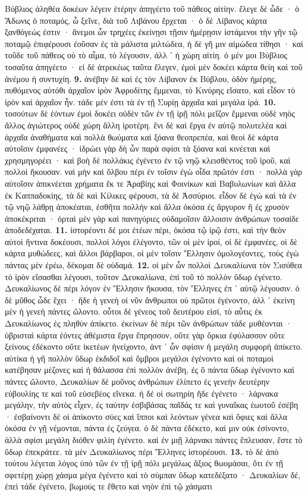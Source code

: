 \documentclass[a4paper, 11pt, oneside, polutonikogreek, german]{article}
\begin{document}
Βύβλιος ἀληθέα δοκέων λέγειν ἑτέρην ἀπηγέετο τοῦ πάθεος αἰτίην. ἔλεγε δὲ ὧδε · ὁ Ἄδωνις ὁ ποταμός, ὦ ξεῖνε, διὰ τοῦ Λιβάνου ἔρχεται · ὁ δὲ Λίβανος κάρτα ξανθόγεώς ἐστιν · ἄνεμοι ὦν τρηχέες ἐκείνῃσι τῇσιν ἡμέρῃσιν ἱστάμενοι τὴν γῆν τῷ ποταμῷ ἐπιφέρουσι ἐοῦσαν ἐς τὰ μάλιστα μιλτώδεα, ἡ δὲ γῆ μιν αἱμώδεα τίθησι · καὶ τοῦδε τοῦ πάθεος οὐ τὸ αἷμα, τὸ λέγουσιν, ἀλλ ᾽ ἡ χώρη αἰτίη. ὁ μέν μοι Βύβλιος τοσαῦτα ἀπηγέετο · εἰ δὲ ἀτρεκέως ταῦτα ἔλεγεν, ἐμοὶ μὲν δοκέει κάρτα θείη καὶ τοῦ ἀνέμου ἡ συντυχίη. \textbf{9.} ἀνέβην δὲ καὶ ἐς τὸν Λίβανον ἐκ Βύβλου, ὁδὸν ἡμέρης, πυθόμενος αὐτόθι ἀρχαῖον ἱρὸν Ἀφροδίτης ἔμμεναι, τὸ Κινύρης εἵσατο, καὶ εἶδον τὸ ἱρὸν καὶ ἀρχαῖον ἦν. τάδε μέν ἐστι τὰ ἐν τῇ Συρίῃ ἀρχαῖα καὶ μεγάλα ἱρά. \textbf{10.} τοσούτων δὲ ἐόντων ἐμοὶ δοκέει οὐδὲν τῶν ἐν τῇ ἱρῇ πόλι μεῖζον ἔμμεναι οὐδὲ νηὸς ἄλλος ἁγιώτερος οὐδὲ χώρη ἄλλη ἱροτέρη. ἔνι δὲ καὶ ἔργα ἐν αὐτῷ πολυτελέα καὶ ἀρχαῖα ἀναθήματα καὶ πολλὰ θωύματα καὶ ξόανα θεοπρεπέα, καὶ θεοὶ δὲ κάρτα αὐτοῖσιν ἐμφανέες · ἱδρώει γὰρ δὴ ὦν παρὰ σφίσι τὰ ξόανα καὶ κινέεται καὶ χρησμηγορέει · καὶ βοὴ δὲ πολλάκις ἐγένετο ἐν τῷ νηῷ κλεισθέντος τοῦ ἱροῦ, καὶ πολλοὶ ἤκουσαν. ναὶ μὴν καὶ ὄλβου πέρι ἐν τοῖσιν ἐγὼ οἶδα πρῶτόν ἐστι · πολλὰ γὰρ αὐτοῖσιν ἀπικνέεται χρήματα ἔκ τε Ἀραβίης καὶ Φοινίκων καὶ Βαβυλωνίων καὶ ἄλλα ἐκ Καππαδοκίης, τὰ δὲ καὶ Κίλικες φέρουσι, τὰ δὲ Ἀσσύριοι. εἶδον δὲ ἐγὼ καὶ τὰ ἐν τῷ νηῷ λάθρῃ ἀποκέαται, ἐσθῆτα πολλὴν καὶ ἄλλα ὁκόσα ἐς ἄργυρον ἢ ἐς χρυσὸν ἀποκέκριται · ὁρταὶ μὲν γὰρ καὶ πανηγύριες οὐδαμοῖσιν ἄλλοισιν ἀνθρώπων τοσαίδε ἀποδεδέχαται. \textbf{11.} ἱστορέοντι δέ μοι ἐτέων πέρι, ὁκόσα τῷ ἱρῷ ἐστι, καὶ τὴν θεὸν αὐτοὶ ἥντινα δοκέουσι, πολλοὶ λόγοι ἐλέγοντο, τῶν οἱ μὲν ἱροί, οἱ δὲ ἐμφανέες, οἱ δὲ κάρτα μυθώδεες, καὶ ἄλλοι βάρβαροι, οἱ μὲν τοῖσιν Ἕλλησιν ὁμολογέοντες, τοὺς ἐγὼ πάντας μὲν ἐρέω, δέκομαι δὲ οὐδαμά. \textbf{12.} οἱ μὲν ὦν πολλοὶ Δευκαλίωνα τὸν Σισύθεα τὸ ἱρὸν εἵσασθαι λέγουσι, τοῦτον Δευκαλίωνα, ἐπὶ τοῦ τὸ πολλὸν ὕδωρ ἐγένετο. Δευκαλίωνος δὲ πέρι λόγον ἐν Ἕλλησιν ἤκουσα, τὸν Ἕλληνες ἐπ ᾽ αὐτῷ λέγουσιν. ὁ δὲ μῦθος ὧδε ἔχει · ἥδε ἡ γενεὴ οἱ νῦν ἄνθρωποι οὐ πρῶτοι ἐγένοντο, ἀλλ ᾽ ἐκείνη μὲν ἡ γενεὴ πάντες ὤλοντο. οὗτοι δὲ γένεος τοῦ δευτέρου εἰσί, τὸ αὖτις ἐκ Δευκαλίωνος ἐς πληθὺν ἀπίκετο. ἐκείνων δὲ πέρι τῶν ἀνθρώπων τάδε μυθέονται · ὑβρισταὶ κάρτα ἐόντες ἀθέμιστα ἔργα ἔπρησσον, οὔτε γὰρ ὅρκια ἐφύλασσον οὔτε ξείνους ἐδέκοντο οὔτε ἱκετέων ἠνείχοντο, ἀντ ᾽ ὧν σφίσιν ἡ μεγάλη συμφορὴ ἀπίκετο. αὐτίκα ἡ γῆ πολλὸν ὕδωρ ἐκδιδοῖ καὶ ὄμβροι μεγάλοι ἐγένοντο καὶ οἱ ποταμοὶ κατέβησαν μέζονες καὶ ἡ θάλασσα ἐπὶ πολλὸν ἀνέβη, ἐς ὃ πάντα ὕδωρ ἐγένοντο καὶ πάντες ὤλοντο, Δευκαλίων δὲ μοῦνος ἀνθρώπων ἐλίπετο ἐς γενεὴν δευτέρην εὐβουλίης τε καὶ τοῦ εὐσεβέος εἵνεκα. ἡ δέ οἱ σωτηρίη ἥδε ἐγένετο · λάρνακα μεγάλην, τὴν αὐτὸς εἶχεν, ἐς ταύτην ἐσβιβάσας παῖδάς τε καὶ γυναῖκας ἑωυτοῦ ἐσέβη · ἐσβαίνοντι δέ οἱ ἀπίκοντο σύες καὶ ἵπποι καὶ λεόντων γένεα καὶ ὄφιες καὶ ἄλλα ὁκόσα ἐν γῇ νέμονται, πάντα ἐς ζεύγεα. ὁ δὲ πάντα ἐδέκετο, καί μιν οὐκ ἐσίνοντο, ἀλλὰ σφίσι μεγάλη διόθεν φιλίη ἐγένετο. καὶ ἐν μιῇ λάρνακι πάντες ἔπλευσαν, ἔστε τὸ ὕδωρ ἐπεκράτεε. τὰ μὲν Δευκαλίωνος πέρι Ἕλληνες ἱστορέουσι. \textbf{13.} τὸ δὲ ἀπὸ τούτου λέγεται λόγος ὑπὸ τῶν ἐν τῇ ἱρῇ πόλι μεγάλως ἄξιος θωυμάσαι, ὅτι ἐν τῇ σφετέρῃ χώρῃ χάσμα μέγα ἐγένετο καὶ τὸ σύμπαν ὕδωρ κατεδέξατο · Δευκαλίων δέ, ἐπεὶ τάδε ἐγένετο, βωμούς τε ἔθετο καὶ νηὸν ἐπὶ τῷ χάσματι 
\end{document}
